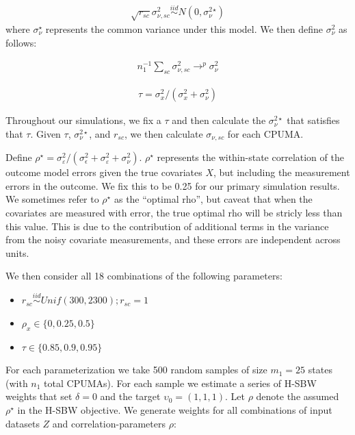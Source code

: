 \begin{align*}
    \sqrt{r_{sc}}\sigma^2_{\nu, sc} \stackrel{iid}\sim N(0, \sigma^2_{\nu}^\star)
\end{align*}
%
where $\sigma_{\nu}^\star$ represents the common variance under this model. We then define $\sigma_{\nu}^2$ as follows:

\begin{align*}
     n_1^{-1}\sum_{sc}\sigma^2_{\nu, sc} \to^p \sigma_{\nu}^2
\end{align*}

\begin{align*}
    \tau = \sigma^2_x/(\sigma^2_x + \sigma^2_{\nu})
\end{align*}

Throughout our simulations, we fix a $\tau$ and then calculate the $\sigma_\nu^{2\star}$ that satisfies that $\tau$. Given $\tau$, $\sigma_{\nu}^{2\star}$, and $r_{sc}$, we then calculate $\sigma_{\nu, sc}$ for each CPUMA.

Define $\rho^\star = \sigma^2_{\varepsilon}/(\sigma^2_{\epsilon} + \sigma^2_{\varepsilon} + \sigma^2_{\nu})$. $\rho^\star$ represents the within-state correlation of the outcome model errors given the true covariates $X$, but including the measurement errors in the outcome. We fix this to be 0.25 for our primary simulation results. We sometimes refer to $\rho^\star$ as the ``optimal rho'', but caveat that when the covariates are measured with error, the true optimal rho will be stricly less than this value. This is due to the contribution of additional terms in the variance from the noisy covariate measurements, and these errors are independent across units.

We then consider all 18 combinations of the following parameters:

\begin{itemize}
    \item $r_{sc} \stackrel{iid}\sim Unif(300, 2300); r_{sc} = 1$ 
    \item $\rho_x \in \{0, 0.25, 0.5\}$
    \item $\tau \in \{0.85, 0.9, 0.95\}$
\end{itemize}

For each parameterization we take 500 random samples of size $m_1 = 25$ states (with $n_1$ total CPUMAs). For each sample we estimate a series of H-SBW weights that set $\delta = 0$ and the target $\upsilon_0 = (1, 1, 1)$. Let $\rho$ denote the assumed $\rho^\star$ in the H-SBW objective. We generate weights for all combinations of input datasets $Z$ and correlation-parameters $\rho$:


